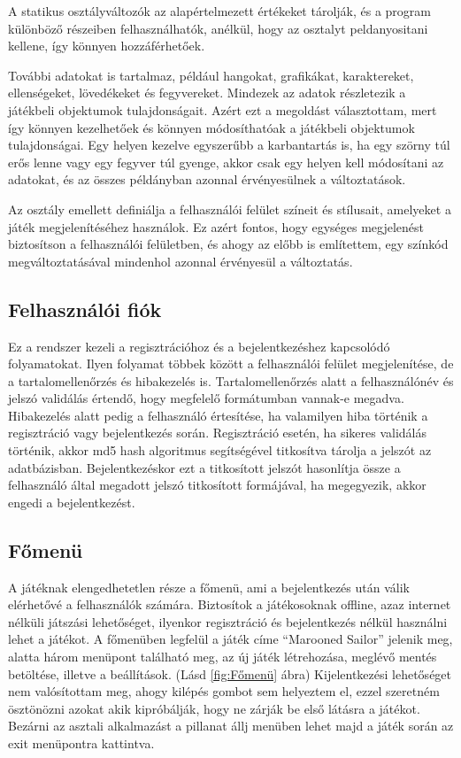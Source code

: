 A statikus osztályváltozók az alapértelmezett értékeket tárolják, és a program különböző részeiben felhasználhatók, anélkül, hogy az osztalyt peldanyositani kellene, így könnyen hozzáférhetőek.

További adatokat is tartalmaz, például hangokat, grafikákat, karaktereket, ellenségeket, lövedékeket és fegyvereket. Mindezek az adatok részletezik a játékbeli objektumok tulajdonságait. Azért ezt a megoldást választottam, mert így könnyen kezelhetőek és könnyen módosíthatóak a játékbeli objektumok tulajdonságai. Egy helyen kezelve egyszerűbb a karbantartás is, ha egy szörny túl erős lenne vagy egy fegyver túl gyenge, akkor csak egy helyen kell módosítani az adatokat, és az összes példányban azonnal érvényesülnek a változtatások.

Az osztály emellett definiálja a felhasználói felület színeit és stílusait, amelyeket a játék megjelenítéséhez használok. Ez azért fontos, hogy egységes megjelenést biztosítson a felhasználói felületben, és ahogy az előbb is említettem, egy színkód megváltoztatásával mindenhol azonnal érvényesül a változtatás.


\subsection{Felhasználói fiók}
 Ez a rendszer kezeli a regisztrációhoz és a bejelentkezéshez kapcsolódó folyamatokat. Ilyen folyamat többek között a felhasználói felület megjelenítése, de a tartalomellenőrzés és hibakezelés is. Tartalomellenőrzés alatt a felhasználónév és jelszó validálás értendő, hogy megfelelő formátumban vannak-e megadva. Hibakezelés alatt pedig a felhasználó értesítése, ha valamilyen hiba történik a regisztráció vagy bejelentkezés során. Regisztráció esetén, ha sikeres validálás történik, akkor md5 hash algoritmus segítségével titkosítva tárolja a jelszót az adatbázisban. Bejelentkezéskor ezt a titkosított jelszót hasonlítja össze a felhasználó által megadott jelszó titkosított formájával, ha megegyezik, akkor engedi a bejelentkezést.

\subsection{Főmenü}

 A játéknak elengedhetetlen része a főmenü, ami a bejelentkezés után válik elérhetővé a felhasználók számára. Biztosítok a játékosoknak offline, azaz internet nélküli játszási lehetőséget, ilyenkor regisztráció és bejelentkezés nélkül használni lehet a játékot.
A főmenüben legfelül a játék címe ``Marooned Sailor'' jelenik meg, alatta három menüpont található meg, az új játék létrehozása, meglévő mentés betöltése, illetve a beállítások. (Lásd \ref{fig:Főmenü} ábra) Kijelentkezési lehetőséget nem valósítottam meg, ahogy kilépés gombot sem helyeztem el, ezzel szeretném ösztönözni azokat akik kipróbálják, hogy ne zárják be első látásra a játékot. Bezárni az asztali alkalmazást a pillanat állj menüben lehet majd a játék során az exit menüpontra kattintva. 

